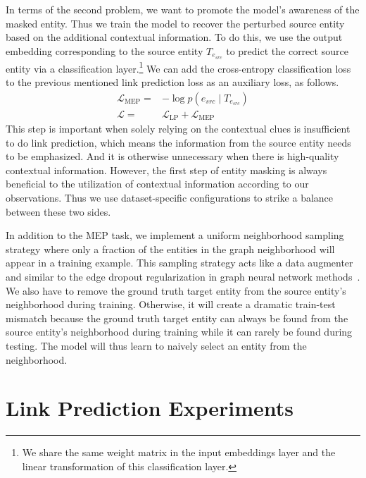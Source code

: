 \documentclass[11pt]{article}
\begin{document}
In terms of the second problem, we want to promote the model's awareness of the masked entity. Thus we train the model to recover the perturbed source entity based on the additional contextual information.
To do this, we use the output embedding corresponding to the source entity $T_{e_{\mathit{src}}}$ to predict the correct source entity via a classification layer.\footnote{We share the same weight matrix in the input embeddings layer and the linear transformation of this classification layer.}
We can add the cross-entropy classification loss to the previous mentioned link prediction loss as an auxiliary loss, as follows.
\begin{align}
\mathcal{L}_{\text{MEP}}=& -\log p(e_{\mathit{src}} \mid T_{e_{\mathit{src}}}) \\
\mathcal{L} =& \mathcal{L}_{\text{LP}} + \mathcal{L}_{\text{MEP}}
\end{align}
This step is important when solely relying on the contextual clues is insufficient to do link prediction, which means the information from the source entity needs to be emphasized.
And it is otherwise unnecessary when there is high-quality contextual information.
However, the first step of entity masking is always beneficial to the utilization of contextual information according to our observations.
Thus we use dataset-specific configurations to strike a balance between these two sides.

In addition to the MEP task, we implement a uniform neighborhood sampling strategy where only a fraction of the entities in the graph neighborhood will appear in a training example.
This sampling strategy acts like a data augmenter and similar to the edge dropout regularization in graph neural network methods~\cite{Rong2020DropEdge}.
We also have to remove the ground truth target entity from the source entity's neighborhood during training. Otherwise, it will create a dramatic train-test mismatch because the ground truth target entity can always be found from the source entity's neighborhood during training while it can rarely be found during testing. The model will thus learn to naively select an entity from the neighborhood.  
\section{Link Prediction Experiments}
\label{sec:experiments}
\end{document}

